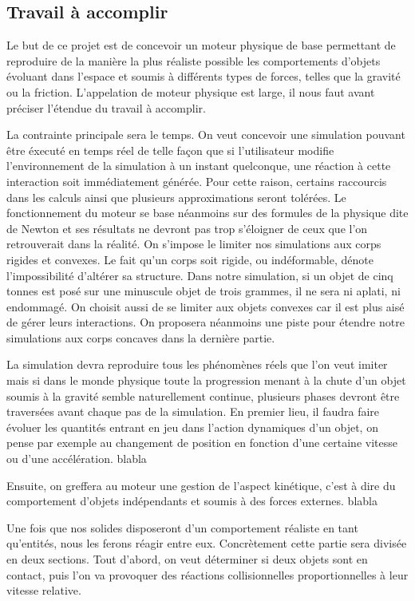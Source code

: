 \documentclass[twocolumn]{article}
\begin{document}
\subsection{Travail à accomplir}

Le but de ce projet est de concevoir un moteur physique de base permettant de reproduire de la manière la plus réaliste possible les comportements d'objets évoluant dans l'espace et soumis à différents types de forces, telles que la gravité ou la friction. L'appelation de moteur physique est large, il nous faut avant préciser l'étendue du travail à accomplir.

La contrainte principale sera le temps. On veut concevoir une simulation pouvant être éxecuté en temps réel de telle façon que si l'utilisateur modifie l'environnement de la simulation à un instant quelconque, une réaction à cette interaction soit immédiatement générée. Pour cette raison, certains raccourcis dans les calculs ainsi que plusieurs approximations seront tolérées. Le fonctionnement du moteur se base néanmoins sur des formules de la physique dite de Newton et ses résultats ne devront pas trop s'éloigner de ceux que l'on retrouverait dans la réalité. On s'impose le limiter nos simulations aux corps rigides et convexes. Le fait qu'un corps soit rigide, ou indéformable, dénote l'impossibilité d'altérer sa structure. Dans notre simulation, si un objet de cinq tonnes est posé sur une minuscule objet de trois grammes, il ne sera ni aplati, ni endommagé. On choisit aussi de se limiter aux objets convexes car il est plus aisé de gérer leurs interactions. On proposera néanmoins une piste pour étendre notre simulations aux corps concaves dans la dernière partie.

La simulation devra reproduire tous les phénomènes réels que l'on veut imiter mais si dans le monde physique toute la progression menant à la chute d'un objet soumis à la gravité semble naturellement continue, plusieurs phases devront être traversées avant chaque pas de la simulation. En premier lieu, il faudra faire évoluer les quantités entrant en jeu dans l'action dynamiques d'un objet, on pense par exemple au changement de position en fonction d'une certaine vitesse ou d'une accélération.  blabla

Ensuite, on greffera au moteur une gestion de l'aspect kinétique, c'est à dire du comportement d'objets indépendants et soumis à des forces externes. blabla

Une fois que nos solides disposeront d'un comportement réaliste en tant qu'entités, nous les ferons réagir entre eux. Concrètement cette partie sera divisée en deux sections. Tout d'abord, on veut déterminer si deux objets sont en contact, puis l'on va provoquer des réactions collisionnelles proportionnelles à leur vitesse relative.
\end{document}
